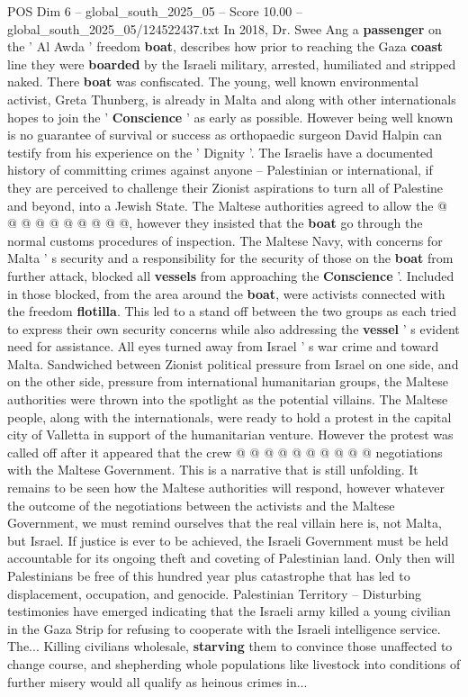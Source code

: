 \begin{textsample}{POS Dim 6 – global\_south\_2025\_05 – Score 10.00 – global\_south\_2025\_05/124522437.txt}
In 2018, Dr.
Swee Ang a \textbf{passenger} on the ' Al Awda ' freedom \textbf{boat}, describes how prior to reaching the Gaza \textbf{coast} line they were \textbf{boarded} by the Israeli military, arrested, humiliated and stripped naked.
There \textbf{boat} was confiscated.
The young, well known environmental activist, Greta Thunberg, is already in Malta and along with other internationals hopes to join the ' \textbf{Conscience} ' as early as possible.
However being well known is no guarantee of survival or success as orthopaedic surgeon David Halpin can testify from his experience on the ' Dignity '.
The Israelis have a documented history of committing crimes against anyone -- Palestinian or international, if they are perceived to challenge their Zionist aspirations to turn all of Palestine and beyond, into a Jewish State.
The Maltese authorities agreed to allow the @ @ @ @ @ @ @ @ @ @, however they insisted that the \textbf{boat} go through the normal customs procedures of inspection.
The Maltese Navy, with concerns for Malta ' s security and a responsibility for the security of those on the \textbf{boat} from further attack, blocked all \textbf{vessels} from approaching the \textbf{Conscience} '.
Included in those blocked, from the area around the \textbf{boat}, were activists connected with the freedom \textbf{flotilla}.
This led to a stand off between the two groups as each tried to express their own security concerns while also addressing the \textbf{vessel} ' s evident need for assistance.
All eyes turned away from Israel ' s war crime and toward Malta.
Sandwiched between Zionist political pressure from Israel on one side, and on the other side, pressure from international humanitarian groups, the Maltese authorities were thrown into the spotlight as the potential villains.
The Maltese people, along with the internationals, were ready to hold a protest in the capital city of Valletta in support of the humanitarian venture.
However the protest was called off after it appeared that the crew @ @ @ @ @ @ @ @ @ @ negotiations with the Maltese Government.
This is a narrative that is still unfolding.
It remains to be seen how the Maltese authorities will respond, however whatever the outcome of the negotiations between the activists and the Maltese Government, we must remind ourselves that the real villain here is, not Malta, but Israel.
If justice is ever to be achieved, the Israeli Government must be held accountable for its ongoing theft and coveting of Palestinian land.
Only then will Palestinians be free of this hundred year plus catastrophe that has led to displacement, occupation, and genocide.
Palestinian Territory -- Disturbing testimonies have emerged indicating that the Israeli army killed a young civilian in the Gaza Strip for refusing to cooperate with the Israeli intelligence service.
The...
Killing civilians wholesale, \textbf{starving} them to convince those unaffected to change course, and shepherding whole populations like livestock into conditions of further misery would all qualify as heinous crimes in...

\end{textsample}

